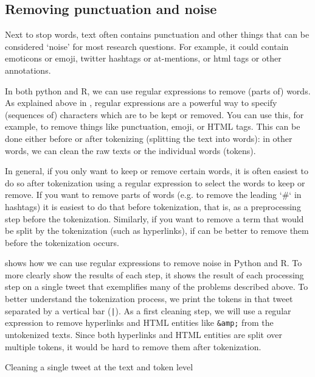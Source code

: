 \subsection{Removing punctuation and noise}


Next to stop words, text often contains punctuation and other things that can be considered `noise' for most research questions.
For example, it could contain emoticons or emoji, twitter hashtags or at-mentions, or html tags or other annotations.

In both python and R, we can use regular expressions to remove (parts of) words. 
As explained above in , regular expressions are a powerful way to specify (sequences of) characters which are to be kept or removed.
You can use this, for example, to remove things like punctuation, emoji, or HTML tags.
This can be done either before or after tokenizing (splitting the text into words):
in other words, we can clean the raw texts or the individual words (tokens). 

In general, if you only want to keep or remove certain words, it is often easiest to do so after tokenization
using a regular expression to select the words to keep or remove.
If you want to remove parts of words (e.g. to remove the leading `\#` in hashtags) it is easiest to do that before tokenization,
that is, as a preprocessing step before the tokenization.
Similarly, if you want to remove a term that would be split by the tokenization (such as hyperlinks),
if can be better to remove them before the tokenization occurs.

 shows how we can use regular expressions to remove noise in Python and R.
To more clearly show the results of each step, it shows the result of each processing step on a single tweet that exemplifies many of the problems described above.
To better understand the tokenization process, we print the tokens in that tweet separated by a vertical bar (\verb+|+). 
As a first cleaning step, we will use a regular expression to remove hyperlinks and HTML entities like \verb|&amp;| from the untokenized texts.
Since both hyperlinks and HTML entities are split over multiple tokens, it would be hard to remove them after tokenization.

\begin{ccsexample}
\caption{Cleaning a single tweet at the text and token level}\label{ex:noise}
\end{ccsexample}

